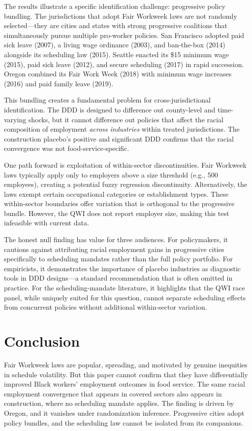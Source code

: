 \documentclass[12pt]{article}
\begin{document}
The results illustrate a specific identification challenge: progressive policy bundling. The jurisdictions that adopt Fair Workweek laws are not randomly selected---they are cities and states with strong progressive coalitions that simultaneously pursue multiple pro-worker policies. San Francisco adopted paid sick leave (2007), a living wage ordinance (2003), and ban-the-box (2014) alongside its scheduling law (2015). Seattle enacted its \$15 minimum wage (2015), paid sick leave (2012), and secure scheduling (2017) in rapid succession. Oregon combined its Fair Work Week (2018) with minimum wage increases (2016) and paid family leave (2019).

This bundling creates a fundamental problem for cross-jurisdictional identification. The DDD is designed to difference out county-level and time-varying shocks, but it cannot difference out policies that affect the racial composition of employment \textit{across industries} within treated jurisdictions. The construction placebo's positive and significant DDD confirms that the racial convergence was not food-service-specific.

One path forward is exploitation of within-sector discontinuities. Fair Workweek laws typically apply only to employers above a size threshold (e.g., 500 employees), creating a potential fuzzy regression discontinuity. Alternatively, the laws exempt certain occupational categories or establishment types. These within-sector boundaries offer variation that is orthogonal to the progressive bundle. However, the QWI does not report employer size, making this test infeasible with current data.

The honest null finding has value for three audiences. For policymakers, it cautions against attributing racial employment gains in progressive cities specifically to scheduling mandates rather than the full policy portfolio. For empiricists, it demonstrates the importance of placebo industries as diagnostic tools in DDD designs---a standard recommendation \citep{olden2022} that is often omitted in practice. For the scheduling-mandate literature, it highlights that the QWI race panel, while uniquely suited for this question, cannot separate scheduling effects from concurrent policies without additional within-sector variation.


\section{Conclusion}

Fair Workweek laws are popular, spreading, and motivated by genuine inequities in schedule volatility. But this paper cannot confirm that they have differentially improved Black workers' employment outcomes in food service. The same racial employment convergence that appears in covered sectors also appears in construction, where no scheduling mandate applies. The finding is driven by Oregon, and it vanishes under randomization inference. Progressive cities adopt policy bundles, and the scheduling law cannot be isolated from its companions.
\end{document}
